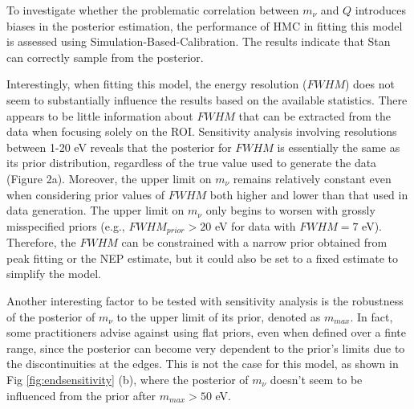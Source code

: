 To investigate whether the problematic correlation between $m_\nu$ and $Q$ introduces biases in the posterior estimation,
the performance of HMC in fitting this model is assessed using Simulation-Based-Calibration.
The results indicate that Stan can correctly sample from the posterior.%

Interestingly, when fitting this model, the energy resolution ($FWHM$) does not seem to substantially influence the
results based on the available statistics. There appears to be little information about $FWHM$ that can be extracted
from the data when focusing solely on the ROI. Sensitivity analysis involving resolutions between 1-20 eV reveals that
the posterior for $FWHM$ is essentially the same as its prior distribution, regardless of the true value used to
generate the data (Figure 2a). Moreover, the upper limit on $m_\nu$ remains relatively constant even when considering
prior values of $FWHM$ both higher and lower than that used in data generation. The upper limit on $m_\nu$ only begins to worsen with grossly misspecified priors (e.g., $FWHM_{prior}>20$ eV for data with $FWHM=7$ eV).
Therefore, the $FWHM$ can be constrained with a narrow prior obtained from peak fitting or the NEP estimate, but it
could also be set to a fixed estimate to simplify the model.

Another interesting factor to be tested with sensitivity analysis is the robustness of the posterior of $m_{\nu}$ to the upper
limit of its prior, denoted as $m_{max}$. In fact, some practitioners advise against using flat priors, even when
defined over a finte range, since the posterior can become very dependent to the prior's limits due to the
discontinuities at the edges. This is not the case for this model, as shown in Fig \ref{fig:endsensitivity} (b), where the
posterior of $m_\nu$ doesn't seem to be influenced from the prior after $m_{max}>50$ eV.%

%

